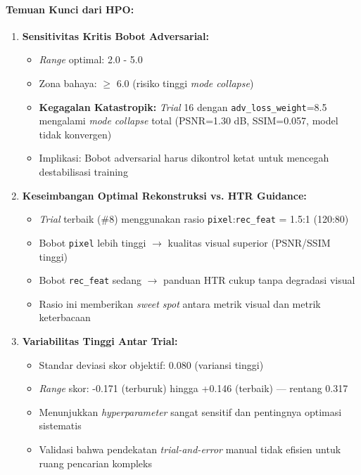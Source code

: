 \documentclass{article}
\begin{document}
\paragraph{Temuan Kunci dari HPO:}

\begin{enumerate}
    \item \textbf{Sensitivitas Kritis Bobot Adversarial:} 
    \begin{itemize}
        \item \textit{Range} optimal: 2.0 - 5.0
        \item Zona bahaya: $\geq$ 6.0 (risiko tinggi \textit{mode collapse})
        \item \textbf{Kegagalan Katastropik:} \textit{Trial} 16 dengan \texttt{adv\_loss\_weight}=8.5 mengalami \textit{mode collapse} total (PSNR=1.30 dB, SSIM=0.057, model tidak konvergen)
        \item Implikasi: Bobot adversarial harus dikontrol ketat untuk mencegah destabilisasi training
    \end{itemize}
    
    \item \textbf{Keseimbangan Optimal Rekonstruksi vs. HTR Guidance:}
    \begin{itemize}
        \item \textit{Trial} terbaik (\#8) menggunakan rasio \texttt{pixel}:\texttt{rec\_feat} = 1.5:1 (120:80)
        \item Bobot \texttt{pixel} lebih tinggi $\rightarrow$ kualitas visual superior (PSNR/SSIM tinggi)
        \item Bobot \texttt{rec\_feat} sedang $\rightarrow$ panduan HTR cukup tanpa degradasi visual
        \item Rasio ini memberikan \textit{sweet spot} antara metrik visual dan metrik keterbacaan
    \end{itemize}
    
    \item \textbf{Variabilitas Tinggi Antar Trial:}
    \begin{itemize}
        \item Standar deviasi skor objektif: 0.080 (variansi tinggi)
        \item \textit{Range} skor: -0.171 (terburuk) hingga +0.146 (terbaik) — rentang 0.317
        \item Menunjukkan \textit{hyperparameter} sangat sensitif dan pentingnya optimasi sistematis
        \item Validasi bahwa pendekatan \textit{trial-and-error} manual tidak efisien untuk ruang pencarian kompleks
    \end{itemize}
    

\end{enumerate}
\end{document}
